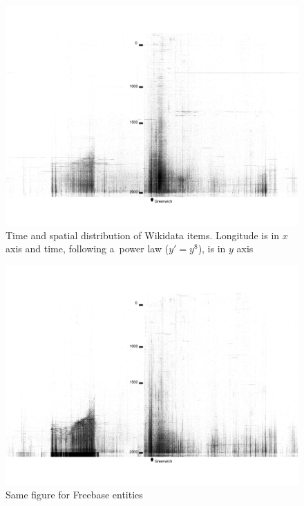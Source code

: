 \documentclass{sig-alternate}
\begin{document}
\begin{figure}[!htbp]
\centering
\includegraphics[width=8.45 cm]{img/wikidata-time-space.png}
\caption{Time and spatial distribution of Wikidata items.
Longitude is in $x$ axis and time, following a~power law ($y' = y^8$), is in $y$ axis}
\label{fig-time-space-wikidata}
\end{figure}

\begin{figure}[!htbp]
\centering
\includegraphics[width=8.45 cm]{img/freebase-time-space.png}
\caption{Same figure for Freebase entities}
\label{fig-time-space-freebase}
\end{figure}
\end{document}
